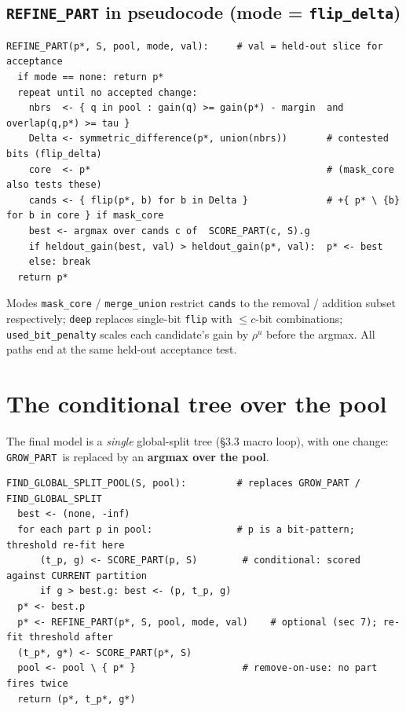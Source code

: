 \documentclass[11pt]{article}
\newcommand{\code}[1]{\texttt{#1}}
\newcommand{\refine}{\code{REFINE\_PART}}
\newcommand{\grow}{\code{GROW\_PART}}
\begin{document}
\subsection{\texorpdfstring{\refine}{REFINE\_PART} in pseudocode (mode = \code{flip\_delta})}
\begin{lstlisting}
REFINE_PART(p*, S, pool, mode, val):     # val = held-out slice for acceptance
  if mode == none: return p*
  repeat until no accepted change:
    nbrs  <- { q in pool : gain(q) >= gain(p*) - margin  and  overlap(q,p*) >= tau }
    Delta <- symmetric_difference(p*, union(nbrs))       # contested bits (flip_delta)
    core  <- p*                                          # (mask_core also tests these)
    cands <- { flip(p*, b) for b in Delta }              # +{ p* \ {b} for b in core } if mask_core
    best <- argmax over cands c of  SCORE_PART(c, S).g
    if heldout_gain(best, val) > heldout_gain(p*, val):  p* <- best
    else: break
  return p*
\end{lstlisting}
Modes \code{mask\_core} / \code{merge\_union} restrict \code{cands} to the removal / addition subset respectively; \code{deep} replaces single-bit \code{flip} with $\le c$-bit combinations; \code{used\_bit\_penalty} scales each candidate's gain by $\rho^{u}$ before the argmax. All paths end at the same held-out acceptance test.


\section{The conditional tree over the pool}


The final model is a \emph{single} global-split tree (\S3.3 macro loop), with one change: \grow\ is replaced by an \textbf{argmax over the pool}.

\begin{lstlisting}
FIND_GLOBAL_SPLIT_POOL(S, pool):         # replaces GROW_PART / FIND_GLOBAL_SPLIT
  best <- (none, -inf)
  for each part p in pool:               # p is a bit-pattern; threshold re-fit here
      (t_p, g) <- SCORE_PART(p, S)        # conditional: scored against CURRENT partition
      if g > best.g: best <- (p, t_p, g)
  p* <- best.p
  p* <- REFINE_PART(p*, S, pool, mode, val)    # optional (sec 7); re-fit threshold after
  (t_p*, g*) <- SCORE_PART(p*, S)
  pool <- pool \ { p* }                   # remove-on-use: no part fires twice
  return (p*, t_p*, g*)
\end{lstlisting}
\end{document}

